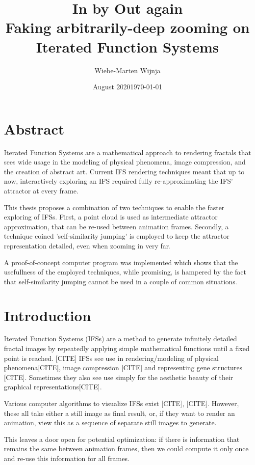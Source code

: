 \documentclass[11pt]{article}
\date{August 2020}
\author{Wiebe-Marten Wijnja}
\date{\today}
\title{\Huge In by Out again\\\medskip
\large Faking arbitrarily-deep zooming on Iterated Function Systems}
\begin{document}
\maketitle
\setcounter{tocdepth}{4}
\tableofcontents

\listoftodos


\section{Abstract}
\label{sec:orgc6d8fce}

Iterated Function Systems are a mathematical approach to rendering fractals that sees wide usage in the modeling of physical phenomena, 
image compression, and the creation of abstract art.
Current IFS rendering techniques meant that up to now, interactively exploring an IFS required fully re-approximating the IFS' attractor at every frame.

This thesis proposes a combination of two techniques to enable the faster exploring of IFSs.
First, a point cloud is used as intermediate attractor approximation, that can be re-used between animation frames.
Secondly, a technique coined 'self-similarity jumping' is employed to keep the attractor representation detailed, even when zooming in very far.

A proof-of-concept computer program was implemented which shows that the usefullness of the employed techniques, while promising, 
is hampered by the fact that self-similarity jumping cannot be used in a couple of common situations.

\section{Introduction}
\label{sec:orga8afed3}

Iterated Function Systems (IFSs) are a method to generate infinitely detailed fractal images 
by repeatedly applying simple mathematical functions until a fixed point is reached. [CITE]
IFSs see use in rendering/modeling of physical phenomena[CITE], image compression [CITE] and representing gene structures [CITE].
Sometimes they also see use simply for the aesthetic beauty of their graphical representations[CITE].

Various computer algorithms to visualize IFSs exist [CITE], [CITE].
However, these all take either a still image as final result, or, if they want to render an animation,
view this as a sequence of separate still images to generate.

This leaves a door open for potential optimization: if there is information that remains the same between animation frames, 
then we could compute it only once and re-use this information for all frames.
\end{document}
